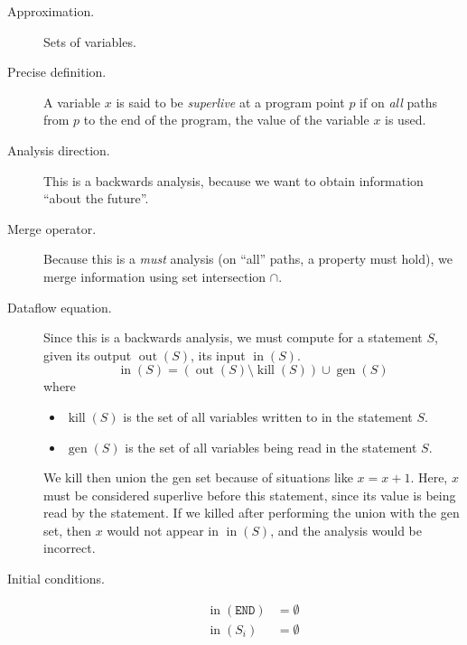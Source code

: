 \documentclass[11pt,letterpaper]{article}
\DeclareMathOperator{\inputOp}{in}
\DeclareMathOperator{\outputOp}{out}
\DeclareMathOperator{\killOp}{kill}
\DeclareMathOperator{\genOp}{gen}
\newcommand{\In}[1]{\inputOp{(#1)}}
\newcommand{\Out}[1]{\outputOp{(#1)}}
\newcommand{\Kill}[1]{\killOp{(#1)}}
\newcommand{\Gen}[1]{\genOp{(#1)}}
\begin{document}
\begin{description}
    \item[Approximation.] Sets of variables.

    \item[Precise definition.]
        A variable $x$ is said to be \emph{superlive} at a program point $p$ if
        on \emph{all} paths from $p$ to the end of the program, the value of
        the variable $x$ is used.

    \item[Analysis direction.]
        This is a backwards analysis, because we want to obtain information
        ``about the future''.

    \item[Merge operator.]
        Because this is a \emph{must} analysis (on ``all'' paths, a property
        must hold), we merge information using set intersection $\cap$.

    \item[Dataflow equation.]
        Since this is a backwards analysis, we must compute for a statement
        $S$, given its output $\Out{S}$, its input $\In{S}$.
        \begin{equation*}
            \In{S} = \left(\Out{S} \setminus \Kill{S}\right) \cup \Gen{S}
        \end{equation*}
        where
        \begin{itemize}
            \item $\Kill{S}$ is the set of all variables written to in the
                statement $S$.

            \item $\Gen{S}$ is the set of all variables being read in the
                statement $S$.
        \end{itemize}

        We kill then union the gen set because of situations like $x = x + 1$.
        Here, $x$ must be considered superlive before this statement, since its
        value is being read by the statement. If we killed after performing the
        union with the gen set, then $x$ would not appear in $\In{S}$, and the
        analysis would be incorrect.

    \item[Initial conditions.]
        \begin{align*}
            \In{\mathtt{END}} &= \emptyset \\
            \In{S_i} &= \emptyset
        \end{align*}
\end{description}
\end{document}
